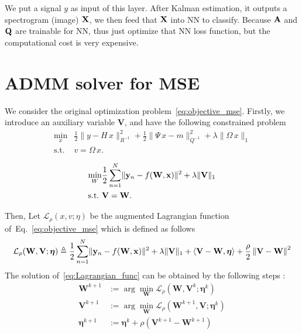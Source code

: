 \documentclass[11pt,a4paper]{article}
\begin{document}
We put a signal $y$ as input of this layer. After Kalman estimation, it outputs a spectrogram (image) $\mathbf{X}$, we then feed that $\mathbf{X}$ into NN to classify. Because $\mathbf{A}$ and $\mathbf{Q}$ are trainable for NN, thus just optimize that NN loss function, but the computational cost is very expensive. 

\section{ADMM solver for MSE}
We consider the original optimization problem~\eqref{eq:objective_mse}. Firstly, we introduce an auxiliary variable $\mathbf{V}$, and have the following constrained problem  
\begin{equation}\label{eq:admm}
\begin{split}
\min_{x} &\frac{1}{2} \| y - H \, x \|^2_{R^{-1}}
   + \frac{1}{2} \| \Psi \, x - m \|^2_{Q^{-1}} 
   + \lambda \|\Omega\, x \|_1  \\
\mathrm{s.t.}\ & v = \Omega\,x . 
\end{split}
\end{equation}

\begin{equation}
\begin{split}
\label{eq:objective_mse}
\min_{W} &\frac{1}{2} \sum_{n=1}^N \lVert\mathbf{y}_n - f(\mathbf{W}, \mathbf{x})\rVert^2 + \lambda \| \mathbf{V} \|_1 \\
\mathrm{s.t.}\ & \mathbf{V} = \mathbf{W} .
\end{split}
\end{equation}

Then, Let $\mathcal{L_\rho}(x,v;\eta)$ be the augmented Lagrangian function of~Eq.~\eqref{eq:objective_mse} which is defined as follows
\begin{equation}\label{eq:Lagrangian_func}
\begin{split}
\begin{aligned}
\mathcal{L_\rho}(\mathbf{W},\mathbf{V};\bm\eta) \triangleq 
 \frac{1}{2} \sum_{n=1}^N \lVert\mathbf{y}_n - f(\mathbf{W}, \mathbf{x})\rVert^2 + \lambda \| \mathbf{V} \|_1 
+ \langle \mathbf{V}- \mathbf{W} ,\bm\eta\rangle
+ \frac{\rho}{2}\left \| \mathbf{V}- \mathbf{W}\right \|^2
\end{aligned}
\end{split}
\end{equation}
The solution of~\eqref{eq:Lagrangian_func} can be obtained by the following steps \cite{Boyd2011ADMM}:
\begin{equation}
\begin{split}
\mathbf{W}^{k+1} &:= \arg\min_{\mathbf{W}} \mathcal{L_\rho} (\mathbf{W},\mathbf{V}^k;\bm\eta^k) \\
\mathbf{V}^{k+1} &:= \arg\min_{\mathbf{W}} \mathcal{L_\rho} (\mathbf{W}^{k+1},\mathbf{V};\bm\eta^k) \\
\bm\eta^{k+1}    &:= \bm\eta^{k} + \rho (\mathbf{V}^{k+1} - \mathbf{W}^{k+1})
\end{split}
\end{equation}
\end{document}
